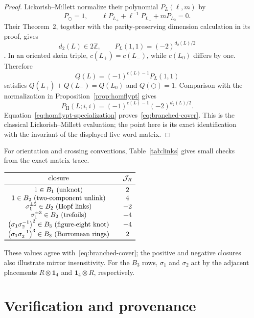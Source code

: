 \documentclass[11pt]{article}
\theoremstyle{remark}
\newcommand{\Id}{\mathbf 1}
\begin{document}
\begin{proof}
Lickorish--Millett normalize their polynomial \(P_L(\ell,m)\) by
\[
  P_{\bigcirc}=1,\qquad
  \ell P_{L_+}+\ell^{-1}P_{L_-}+mP_{L_0}=0.
\]
Their Theorem~2, together with the parity-preserving dimension calculation in
its proof, gives
\[
  d_2(L)\in2\mathbb Z,\qquad P_L(1,1)=(-2)^{d_2(L)/2}
\]
\cite[Theorem~2 and pp.~353--355]{LickorishMillett1986}.  In an oriented skein
triple, \(c(L_+)=c(L_-)\), while \(c(L_0)\) differs by one.  Therefore
\[
  Q(L)=(-1)^{c(L)-1}P_L(1,1)
\]
satisfies \(Q(L_+)+Q(L_-)=Q(L_0)\) and \(Q(\bigcirc)=1\).  Comparison with the
normalization in Proposition~\ref{prop:homflypt} gives
\[
  P_{\mathrm H}(L;i,i)=(-1)^{c(L)-1}(-2)^{d_2(L)/2}.
\]
Equation~\eqref{eq:homflypt-specialization} proves~\eqref{eq:branched-cover}.
This is the classical Lickorish--Millett evaluation; the point here is its exact
identification with the invariant of the displayed five-word matrix.
\end{proof}

For orientation and crossing conventions, Table~\ref{tab:links} gives small
checks from the exact matrix trace.
\begin{center}
\label{tab:links}
\(
\begin{array}{c@{\qquad}c}
\toprule
\text{closure} & \mathcal J_R\\
\midrule
1\in B_1\ (\text{unknot}) & 2\\
1\in B_2\ (\text{two-component unlink}) & 4\\
\sigma_1^{\pm2}\in B_2\ (\text{Hopf links}) & -2\\
\sigma_1^{\pm3}\in B_2\ (\text{trefoils}) & -4\\
\bigl(\sigma_1\sigma_2^{-1}\bigr)^2\in B_3\ (\text{figure-eight knot}) & -4\\
\bigl(\sigma_1\sigma_2^{-1}\bigr)^3\in B_3\ (\text{Borromean rings}) & 2\\
\bottomrule
\end{array}
\)
\end{center}
These values agree with~\eqref{eq:branched-cover}; the positive and negative
closures also illustrate mirror insensitivity.  For the \(B_3\) rows,
\(\sigma_1\) and \(\sigma_2\) act by the adjacent placements
\(R\otimes\Id_4\) and \(\Id_4\otimes R\), respectively.

\section{Verification and provenance}\label{sec:verification}
\end{document}
